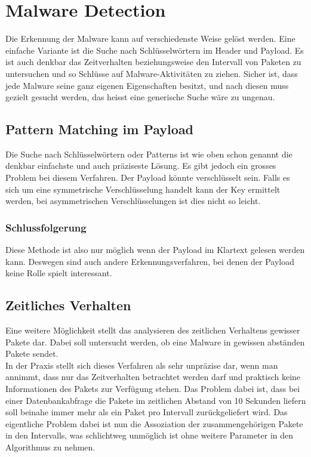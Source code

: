 \section{Malware Detection}
\label{analyse:detection}
Die Erkennung der Malware kann auf verschiedenste Weise gelöst werden. Eine einfache Variante ist die Suche nach Schlüsselwörtern im Header und Payload. Es ist auch denkbar das Zeitverhalten beziehungsweise den Intervall von Paketen zu untersuchen und so Schlüsse auf Malware-Aktivitäten zu ziehen. Sicher ist, dass jede Malware seine ganz eigenen Eigenschaften besitzt, und nach diesen muss gezielt gesucht werden, das heisst eine generische Suche wäre zu ungenau.

\subsection{Pattern Matching im Payload}
Die Suche nach Schlüsselwörtern oder Patterns ist wie oben schon genannt die denkbar einfachste und auch präziseste Lösung. Es gibt jedoch ein grosses Problem bei diesem Verfahren. Der Payload könnte verschlüsselt sein. Falls es sich um eine symmetrische Verschlüsselung handelt kann der Key ermittelt werden, bei asymmetrischen Verschlüsselungen ist dies nicht so leicht. 

\subsubsection{Schlussfolgerung}
Diese Methode ist also nur möglich wenn der Payload im Klartext gelesen werden kann. Deswegen sind auch andere Erkennungsverfahren, bei denen der Payload keine Rolle spielt interessant.

\subsection{Zeitliches Verhalten}
Eine weitere Möglichkeit stellt das analysieren des zeitlichen Verhaltens gewisser Pakete dar. Dabei soll untersucht werden, ob eine Malware in gewissen abständen Pakete sendet.\\

In der Praxis stellt sich dieses Verfahren als sehr unpräzise dar, wenn man annimmt, dass nur das Zeitverhalten betrachtet werden darf und praktisch keine Informationen des Pakets zur Verfügung stehen. Das Problem dabei ist, dass bei einer Datenbankabfrage die Pakete im zeitlichen Abstand von 10 Sekunden liefern soll beinahe immer mehr als ein Paket pro Intervall zurückgeliefert wird. Das eigentliche Problem dabei ist nun die Assoziation der zusammengehörigen Pakete in den Intervalls, was schlichtweg unmöglich ist ohne weitere Parameter in den Algorithmus zu nehmen.

